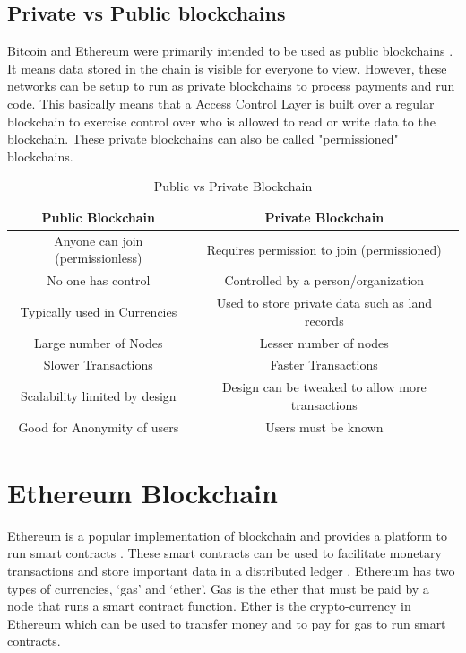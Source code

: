\documentclass[11pt,openright]{report}
\begin{document}
\subsection{Private vs Public blockchains}
Bitcoin and Ethereum were primarily intended to be used as public blockchains \cite{privpubarticle}. It means data stored in the chain is visible for everyone to view. However, these networks can be setup to run as private blockchains to process payments and run code. This basically means that a Access Control Layer is built over a regular blockchain to exercise control over who is allowed to read or write data to the blockchain. These private blockchains can also be called "permissioned" blockchains.

\begin{table}[!htbp]
	\renewcommand{\arraystretch}{1.3}
	\caption{Public vs Private Blockchain}
	\label{pub_priv_blockchains}
	\centering
	\begin{tabular}{|c|c|}
		\hline
		\bfseries Public Blockchain & \bfseries Private Blockchain \\
		\hline\hline
		Anyone can join (permissionless) & Requires permission to join (permissioned) \\ \hline
	    No one has control & Controlled by a person/organization \\ \hline
        Typically used in Currencies & Used to store private data such as land records \\ \hline
        Large number of Nodes & Lesser number of nodes \\ \hline
        Slower Transactions  & Faster Transactions \\ \hline
        Scalability limited by design  & Design can be tweaked to allow more transactions \\ \hline
        Good for Anonymity of users  & Users must be known \\ \hline
	\end{tabular}
\end{table}


\section{Ethereum Blockchain}
Ethereum is a popular implementation of blockchain and provides a platform to run smart contracts \cite{buterin2013whitepaper}. These smart contracts can be used to facilitate monetary transactions and store important data in a distributed ledger \cite{egbertsen2016replacing}. Ethereum has two types of currencies, ‘gas’ and ‘ether’. Gas is the ether that must be paid by a node that runs a smart contract function. Ether is the crypto-currency in Ethereum which can be used to transfer money and to pay for gas to run smart contracts.
\end{document}
